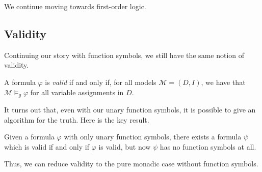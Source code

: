 
We continue moving towards first-order logic.

\subsection{Validity}
Continuing our story with function symbols, we still have the same notion of validity.
\begin{defihelper}[Valid]
	A formula $\varphi$ is \textit{valid} if and only if, for all models $\mathcal M=(D,I)$, we have that $\mathcal M\models_g\varphi$ for all variable assignments in $D$.
\end{defihelper}
It turns out that, even with our unary function symbols, it is possible to give an algorithm for the truth. Here is the key result.
\begin{theorem}
	Given a formula $\varphi$ with only unary function symbols, there exists a formula $\psi$ which is valid if and only if $\varphi$ is valid, but now $\psi$ has no function symbols at all.
\end{theorem}
Thus, we can reduce validity to the pure monadic case without function symbols.

